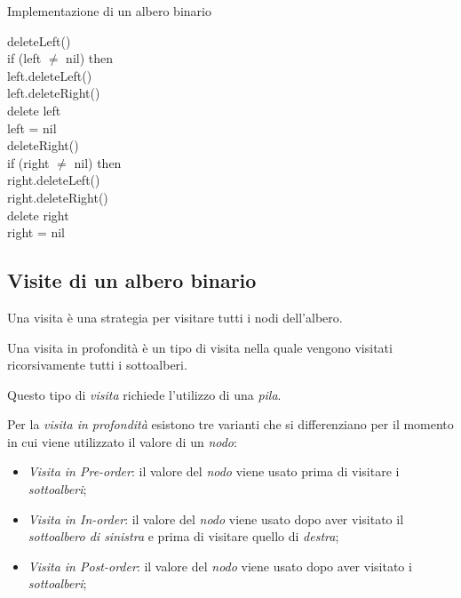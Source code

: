 \begin{code}{Implementazione di un albero binario}
\begin{minipage}[t]{0.48\textwidth}
        \ind deleteLeft()\\
            \indf if (left $\neq$ nil) then\\
                left.deleteLeft()\\
                left.deleteRight()\\
                delete left\\
                left = nil\\
            
        \ind deleteRight()\\
            \indf if (right $\neq$ nil) then\\
                right.deleteLeft()\\
                right.deleteRight()\\
                delete right\\
                right = nil\\
    \end{minipage}
\end{code}

\subsection{Visite di un albero binario}
\begin{definition}
    Una visita è una strategia per visitare tutti i nodi dell'albero.
\end{definition}
\begin{definition}
    Una visita in profondità è un tipo di visita nella quale vengono visitati
    ricorsivamente tutti i sottoalberi.
\end{definition}
\begin{note}
    Questo tipo di \emph{visita} richiede l'utilizzo di una \emph{pila}.
\end{note}\noindent
Per la \emph{visita in profondità} esistono tre varianti che si differenziano per
il momento in cui viene utilizzato il valore di un \emph{nodo}:
\begin{itemize}
    \item \emph{Visita in Pre-order}: il valore del \emph{nodo} viene usato prima
    di visitare i \emph{sottoalberi};
    \item \emph{Visita in In-order}: il valore del \emph{nodo} viene usato dopo
    aver visitato il \emph{sottoalbero di sinistra} e prima di visitare quello di
    \emph{destra};
    \item \emph{Visita in Post-order}: il valore del \emph{nodo} viene usato dopo
    aver visitato i \emph{sottoalberi}; 
\end{itemize}

